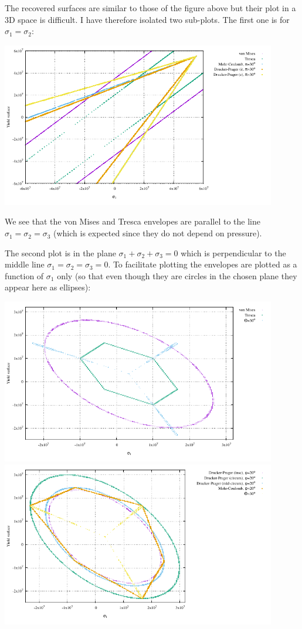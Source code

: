 The recovered surfaces are similar to those of the figure above but their plot in a 3D space is difficult.
I have therefore isolated two sub-plots. 
The first one is for $\sigma_1=\sigma_2$:

\begin{center}
\includegraphics[width=12cm]{images/rheology/surfaces/surfaces_xy.pdf}
\end{center}
We see that the von Mises and Tresca envelopes are parallel to the line $\sigma_1=\sigma_2=\sigma_3$ (which 
is expected since they do not depend on pressure).

The second plot is in the plane $\sigma_1+\sigma_2+\sigma_3=0$ which is perpendicular to the middle line 
$\sigma_1=\sigma_2=\sigma_3=0$. To facilitate plotting the envelopes are plotted as a function of $\sigma_1$ only (so that even though they are circles in the chosen plane they appear here as ellipses):

\begin{center}
\includegraphics[width=12cm]{images/rheology/surfaces/surfaces_plane2.pdf}
\includegraphics[width=12cm]{images/rheology/surfaces/surfaces_plane.pdf}
\end{center}

